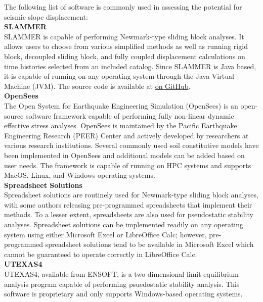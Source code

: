 The following list of software is commonly used in assessing the potential for seismic slope displacement:\\

\noindent\textbf{SLAMMER}\\
SLAMMER \citep{jibson2013slammer} is capable of performing Newmark-type sliding block analyses. It allows users to choose from various simplified methods as well as running rigid block, decoupled sliding block, and fully coupled displacement calculations on time histories selected from an included catalog. Since SLAMMER is Java based, it is capable of running on any operating system through the Java Virtual Machine (JVM). The source code is available at \href{https://github.com/mjibson/slammer}{on GitHub}. \\

\noindent\textbf{OpenSees}\\
The Open System for Earthquake Engineering Simulation (OpenSees) is an open-source software framework capable of performing fully non-linear dynamic effective stress analyses. OpenSees is maintained by the Pacific Earthquake Engineering Research (PEER) Center and actively developed by researchers at various research institutions. Several commonly used soil constitutive models have been implemented in OpenSees and additional models can be added based on user needs. The framework is capable of running on HPC systems and supports MacOS, Linux, and Windows operating systems.\\

\noindent\textbf{Spreadsheet Solutions}\\
Spreadsheet solutions are routinely used for Newmark-type sliding block analyses, with some authors releasing pre-programmed spreadsheets that implement their methods. To a lesser extent, spreadsheets are also used for pseudostatic stability analyses. Spreadsheet solutions can be implemented readily on any operating system using either Microsoft Excel or LibreOffice Calc; however, pre-programmed spreadsheet solutions tend to be available in Microsoft Excel which cannot be guaranteed to operate correctly in LibreOffice Calc.\\

\noindent\textbf{UTEXAS4}\\
UTEXAS4, available from ENSOFT, is a two dimensional limit equilibrium analysis program capable of performing psuedostatic stability analysis. This software is proprietary and only supports Windows-based operating systems.\\

